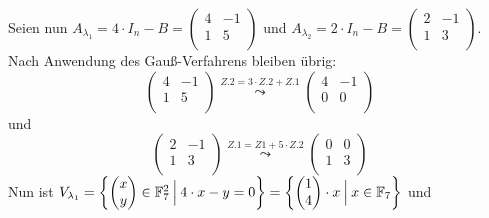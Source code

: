 \documentclass{scrreprt}
\begin{document}
\begin{enumerate}[(i)]
  Seien nun $A_{\lambda_1} = 4 \cdot I_n - B = \begin{pmatrix}
    4 & -1 \\
    1 & 5 \\
  \end{pmatrix}$ und
  $A_{\lambda_2} = 2 \cdot I_n - B = \begin{pmatrix}
    2 & -1 \\
    1 & 3 \\
  \end{pmatrix}$.
  Nach Anwendung des Gauß-Verfahrens bleiben übrig:
  \[
    \begin{pmatrix}
      4 & -1 \\
      1 & 5 \\
    \end{pmatrix}
    \overset{Z.2 = 3 \cdot Z.2 + Z.1}\leadsto
    \begin{pmatrix}
      4 & -1 \\
      0 & 0 \\
    \end{pmatrix}
  \]
  und
  \[
    \begin{pmatrix}
      2 & -1 \\
      1 & 3 \\
    \end{pmatrix}
    \overset{Z.1 = Z1 + 5 \cdot Z.2}\leadsto
    \begin{pmatrix}
      0 & 0 \\
      1 & 3 \\
    \end{pmatrix}
  \]
  Nun ist $V_{\lambda_1} = \qty{
    \begin{pmatrix}x\\y\end{pmatrix} \in \mathbb{F}_7^2
    \:{\Big |}\:
    4 \cdot x - y = 0
  } = \qty{
    \begin{pmatrix}1\\4\end{pmatrix} \cdot x
    \:{\Big |}\:
    x \in \mathbb{F}_7
  }$ und


\end{enumerate}
\end{document}
